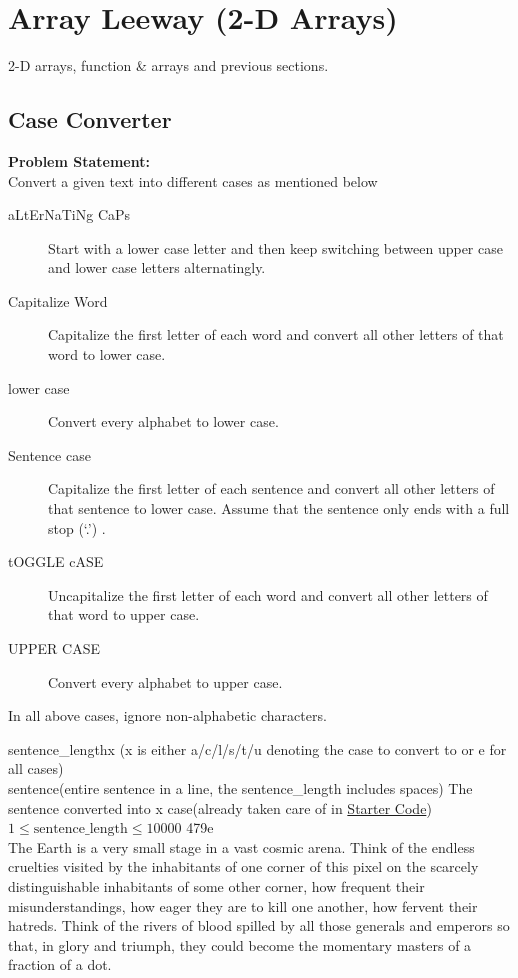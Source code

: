 \recalctypearea
{\scriptsize
\section{Array Leeway (2-D Arrays)}
\begin{topics}
2-D arrays, function \& arrays and previous sections.
\end{topics}
\subsection{Case Converter}
\textbf{Problem Statement:}\\
Convert a given text into different cases as mentioned below
\begin{description}
	\item[aLtErNaTiNg CaPs] Start with a lower case letter and then keep switching between upper case and lower case letters alternatingly.
	\item[Capitalize Word] Capitalize the first letter of each word and convert all other letters of that word to lower case.
	\item[lower case] Convert every alphabet to lower case.
	\item[Sentence case] Capitalize the first letter of each sentence and convert all other letters of that sentence to lower case. Assume that the sentence only ends with a full stop (`.') .
	\item[tOGGLE cASE] Uncapitalize the first letter of each word and convert all other letters of that word to upper case.
	\item[UPPER CASE] Convert every alphabet to upper case.
\end{description}
\begin{note}
	In all above cases, ignore non-alphabetic characters.
\end{note}
\begin{testcases}
	{sentence\_length\quad x \hfill(x is either a/c/l/s/t/u denoting the case to convert to or e for all cases)\\
	sentence\hfill(entire sentence in a line, the sentence\_length includes spaces)}
	{The sentence converted into x case\hfill{(already taken care of in \href{https://github.com/paramrathour/CS-101/tree/main/Starter Codes/Case Converter.cpp}{Starter Code})}}
	{$1 \leq \text{sentence\_length} \leq 10000$}
	{479\quad e\\The Earth is a very small stage in a vast cosmic arena. Think of the endless cruelties visited by the inhabitants of one corner of this pixel on the scarcely distinguishable inhabitants of some other corner, how frequent their misunderstandings, how eager they are to kill one another, how fervent their hatreds. Think of the rivers of blood spilled by all those generals and emperors so that, in glory and triumph, they could become the momentary masters of a fraction of a dot.}

\end{testcases}}
